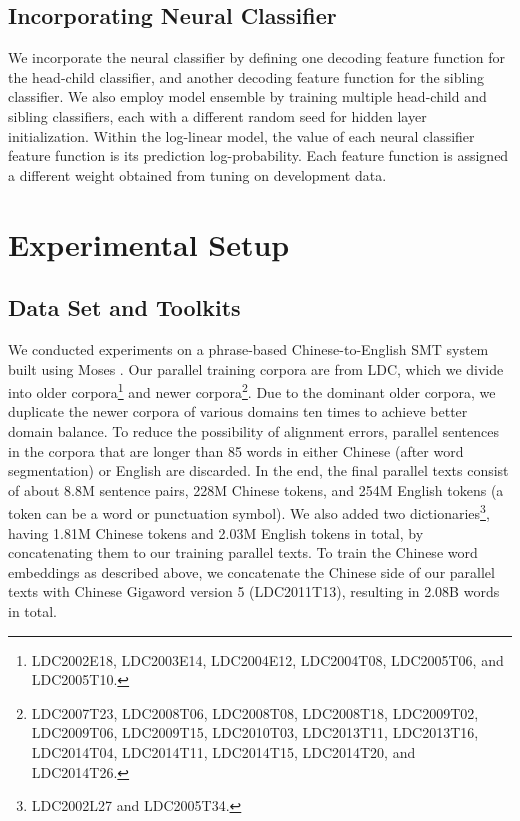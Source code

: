 \documentclass[letterpaper]{article}
\begin{document}
\subsection{Incorporating Neural Classifier}

We incorporate the neural classifier by defining one decoding feature function for the head-child classifier, and another decoding feature function for the sibling classifier. We also employ model ensemble by training multiple head-child and sibling classifiers, each with a different random seed for hidden layer initialization. Within the log-linear model, the value of each neural classifier feature function is its prediction log-probability. Each feature function is assigned a different weight obtained from tuning on development data.

\section{Experimental Setup}
\subsection{Data Set and Toolkits}

We conducted experiments on a phrase-based Chinese-to-English SMT system built using Moses \cite{koehn_moses:_2007}. Our parallel training corpora are from LDC, which we divide into older corpora\footnote{LDC2002E18, LDC2003E14, LDC2004E12, LDC2004T08, LDC2005T06, and LDC2005T10.} and newer corpora\footnote{LDC2007T23, LDC2008T06, LDC2008T08, LDC2008T18, LDC2009T02, LDC2009T06, LDC2009T15, LDC2010T03, LDC2013T11, LDC2013T16, LDC2014T04, LDC2014T11, LDC2014T15, LDC2014T20, and LDC2014T26.}. Due to the dominant older corpora, we duplicate the newer corpora of various domains ten times to achieve better domain balance. To reduce the possibility of alignment errors, parallel sentences in the corpora that are longer than 85 words in either Chinese (after word segmentation) or English are discarded. In the end, the final parallel texts consist of about 8.8M sentence pairs, 228M Chinese tokens, and 254M English tokens (a token can be a word or punctuation symbol). We also added two dictionaries\footnote{LDC2002L27 and LDC2005T34.}, having 1.81M Chinese tokens and 2.03M English tokens in total, by concatenating them to our training parallel texts. To train the Chinese word embeddings as described above, we concatenate the Chinese side of our parallel texts with Chinese Gigaword version 5 (LDC2011T13), resulting in 2.08B words in total.
\end{document}
